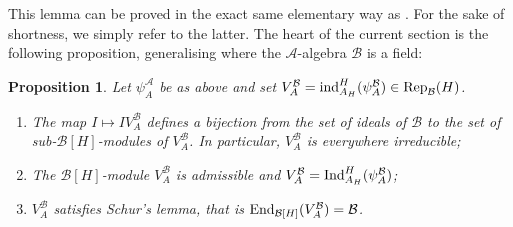 \documentclass[11pt]{article}
\theoremstyle{plain}
\newtheorem{prop}[theo]{Proposition}
\theoremstyle{definition}
\theoremstyle{plain}
\theoremstyle{definition}
\theoremstyle{plain}
\begin{document}
This lemma can be proved in the exact same elementary way as  \cite[Lem. 2.2 a)]{trias_theta1}. For the sake of shortness, we simply refer to the latter. The heart of the current section is the following proposition, generalising \cite[Lem. 2.2 b)]{trias_theta1} where the $\mathcal{A}$-algebra $\mathcal{B}$ is a field:

\begin{prop} \label{metaplectic_representations_prop} Let $\psi_A^\mathcal{A}$ be as above and set $V_A^\mathcal{B} = \textup{ind}_{A_H}^H(\psi_A^\mathcal{B}) \in \textup{Rep}_\mathcal{B}(H)$.
\begin{enumerate}[label=\textup{\alph*)}]
\item The map $I \mapsto IV_A^\mathcal{B}$ defines a bijection from the set of ideals of $\mathcal{B}$ to the set of sub-$\mathcal{B}[H]$-modules of $V_A^\mathcal{B}$. In particular, $V_A^\mathcal{B}$ is everywhere irreducible;
\item The $\mathcal{B}[H]$-module $V_A^\mathcal{B}$ is admissible and $V_A^\mathcal{B} = \textup{Ind}_{A_H}^H(\psi_A^\mathcal{B})$;
\item $V_A^\mathcal{B}$ satisfies Schur's lemma, that is $\textup{End}_{\mathcal{B}[H]}(V_A^\mathcal{B}) = \mathcal{B}$.
\end{enumerate} \end{prop}
\end{document}
